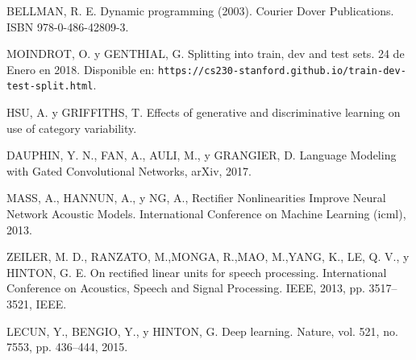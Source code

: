 \begin{thebibliography}{9}
 BELLMAN, R. E. Dynamic programming (2003). Courier Dover Publications. ISBN 978-0-486-42809-3.

 MOINDROT, O. y GENTHIAL, G. Splitting into train, dev and test sets. 24 de Enero en 2018. Disponible en: \texttt{https://cs230-stanford.github.io/train-dev-test-split.html}.

 HSU, A. y GRIFFITHS, T. Effects of generative and discriminative learning on use of category variability.

 DAUPHIN, Y. N., FAN, A., AULI, M., y GRANGIER, D. Language Modeling with Gated Convolutional Networks, arXiv, 2017.

 MASS, A., HANNUN, A., y NG, A., Rectifier Nonlinearities Improve Neural Network Acoustic Models. International Conference on Machine Learning (icml), 2013.

 ZEILER, M. D., RANZATO, M.,MONGA, R.,MAO, M.,YANG, K., LE, Q. V., y HINTON, G. E. On rectified linear units for speech processing. International Conference on Acoustics, Speech and Signal Processing. IEEE, 2013, pp. 3517–3521, IEEE.

 LECUN, Y., BENGIO, Y., y HINTON, G. Deep learning. Nature, vol. 521, no. 7553, pp. 436–444, 2015.



\end{thebibliography} 
